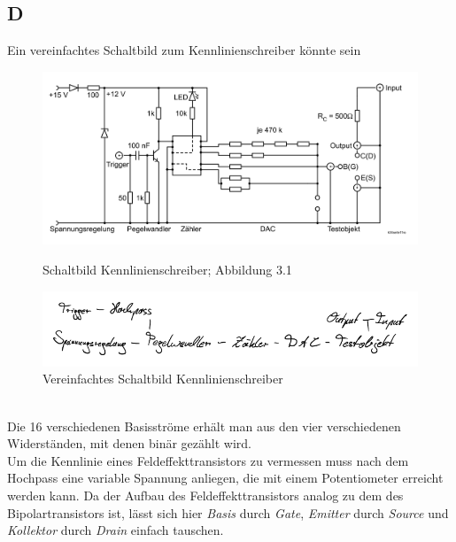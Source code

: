 \documentclass[10pt]{article}
\begin{document}
\begin{multicols}{2}
	\subsection{D}
	Ein vereinfachtes Schaltbild zum Kennlinienschreiber könnte sein
	\begin{figure}[h]
		\begin{minipage}{0.5\textwidth}
			\centering
			\includegraphics[width=\textwidth]{kennlinienschreiber.png}
			\caption{Schaltbild Kennlinienschreiber; Abbildung 3.1 \cite{Praktikumsanleitung}}
		\end{minipage}
		\begin{minipage}{0.5\textwidth}
			\centering
			\includegraphics[width=\textwidth]{D_crop.pdf}
			\caption{Vereinfachtes Schaltbild Kennlinienschreiber}
		\end{minipage}
	\end{figure}\\
	Die 16 verschiedenen Basisströme erhält man aus den vier verschiedenen Widerständen, mit denen binär gezählt wird.
	\\\indent Um die Kennlinie eines Feldeffekttransistors zu vermessen muss nach dem Hochpass eine variable Spannung anliegen, die mit einem Potentiometer erreicht werden kann.
	Da der Aufbau des Feldeffekttransistors analog zu dem des Bipolartransistors ist, lässt sich hier \textit{Basis} durch \textit{Gate}, \textit{Emitter} durch \textit{Source} und \textit{Kollektor} durch \textit{Drain} einfach tauschen.


\end{multicols}
\end{document}

